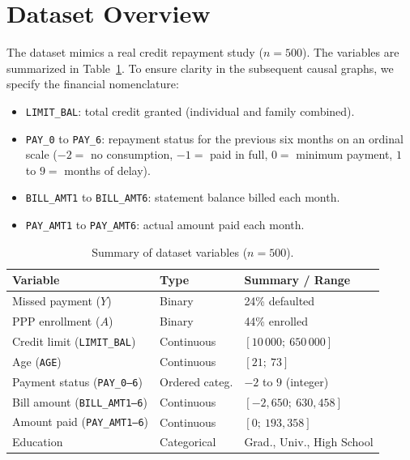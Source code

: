 \documentclass[11pt, a4paper]{article}
\theoremstyle{definition}
\begin{document}
\section{Dataset Overview}

The dataset mimics a real credit repayment study ($n = 500$). The variables are summarized
in Table~\ref{tab:data-summary}. To ensure clarity in the subsequent causal graphs, we
specify the financial nomenclature:
\begin{itemize}
    \item \texttt{LIMIT\_BAL}: total credit granted (individual and family combined).
    \item \texttt{PAY\_0} to \texttt{PAY\_6}: repayment status for the previous six months
    on an ordinal scale ($-2 =$ no consumption, $-1 =$ paid in full, $0 =$ minimum payment,
    $1$ to $9 =$ months of delay).
    \item \texttt{BILL\_AMT1} to \texttt{BILL\_AMT6}: statement balance billed each month.
    \item \texttt{PAY\_AMT1} to \texttt{PAY\_AMT6}: actual amount paid each month.
\end{itemize}

\begin{table}[H]
    \centering
    \caption{Summary of dataset variables ($n = 500$).}
    \label{tab:data-summary}
    \begin{tabular}{p{5.5cm} p{3.5cm} p{5cm}}
        \toprule
        \textbf{Variable} & \textbf{Type} & \textbf{Summary / Range} \\
        \midrule
        Missed payment ($Y$)              & Binary           & 24\% defaulted \\
        PPP enrollment ($A$)              & Binary           & 44\% enrolled \\
        Credit limit (\texttt{LIMIT\_BAL})& Continuous       & $[10\,000;\ 650\,000]$ \\
        Age (\texttt{AGE})                & Continuous       & $[21;\ 73]$ \\
        Payment status (\texttt{PAY\_0--6})& Ordered categ.  & $-2$ to $9$ (integer) \\
        Bill amount (\texttt{BILL\_AMT1--6})& Continuous     & $[-2{,}650;\ 630{,}458]$ \\
        Amount paid (\texttt{PAY\_AMT1--6}) & Continuous     & $[0;\ 193{,}358]$ \\
        Education                         & Categorical      & Grad., Univ., High School \\
        \bottomrule
    \end{tabular}
\end{table}
\end{document}
